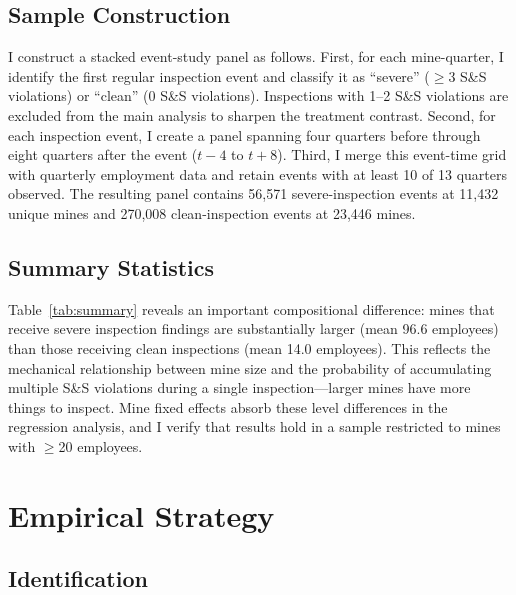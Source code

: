 \documentclass[12pt]{article}
\begin{document}
\subsection{Sample Construction}

I construct a stacked event-study panel as follows. First, for each mine-quarter, I identify the first regular inspection event and classify it as ``severe'' ($\geq$3 S\&S violations) or ``clean'' (0 S\&S violations). Inspections with 1--2 S\&S violations are excluded from the main analysis to sharpen the treatment contrast. Second, for each inspection event, I create a panel spanning four quarters before through eight quarters after the event ($t-4$ to $t+8$). Third, I merge this event-time grid with quarterly employment data and retain events with at least 10 of 13 quarters observed. The resulting panel contains 56,571 severe-inspection events at 11,432 unique mines and 270,008 clean-inspection events at 23,446 mines.

\subsection{Summary Statistics}



Table~\ref{tab:summary} reveals an important compositional difference: mines that receive severe inspection findings are substantially larger (mean 96.6 employees) than those receiving clean inspections (mean 14.0 employees). This reflects the mechanical relationship between mine size and the probability of accumulating multiple S\&S violations during a single inspection---larger mines have more things to inspect. Mine fixed effects absorb these level differences in the regression analysis, and I verify that results hold in a sample restricted to mines with $\geq$20 employees.


\section{Empirical Strategy}

\subsection{Identification}
\end{document}
